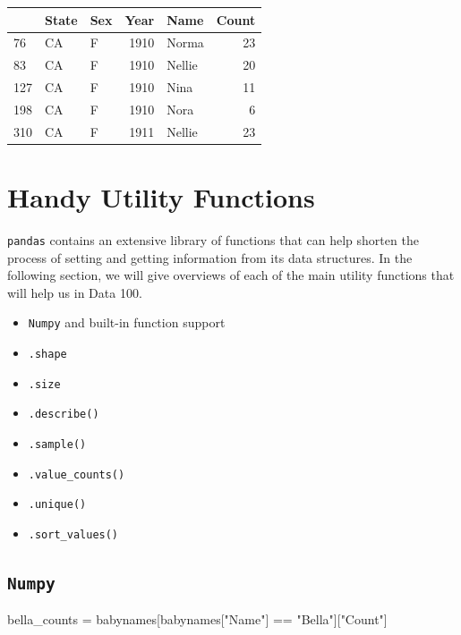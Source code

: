 \documentclass[
  letterpaper,
  DIV=11,
  numbers=noendperiod]{scrreprt}
\newenvironment{Shaded}{\begin{snugshade}}{\end{snugshade}}
\newcommand{\NormalTok}[1]{\textcolor[rgb]{0.00,0.23,0.31}{#1}}
\newcommand{\OperatorTok}[1]{\textcolor[rgb]{0.37,0.37,0.37}{#1}}
\newcommand{\StringTok}[1]{\textcolor[rgb]{0.13,0.47,0.30}{#1}}
\providecommand{\tightlist}{%
  \setlength{\itemsep}{0pt}\setlength{\parskip}{0pt}}\usepackage{longtable,booktabs,array}
\begin{document}
\begin{tabular}{lllrlr}
\toprule
{} & State & Sex &  Year &    Name &  Count \\
\midrule
76  &    CA &   F &  1910 &   Norma &     23 \\
83  &    CA &   F &  1910 &  Nellie &     20 \\
127 &    CA &   F &  1910 &    Nina &     11 \\
198 &    CA &   F &  1910 &    Nora &      6 \\
310 &    CA &   F &  1911 &  Nellie &     23 \\
\bottomrule
\end{tabular}

\hypertarget{handy-utility-functions}{%
\section{Handy Utility Functions}\label{handy-utility-functions}}

\texttt{pandas} contains an extensive library of functions that can help
shorten the process of setting and getting information from its data
structures. In the following section, we will give overviews of each of
the main utility functions that will help us in Data 100.

\begin{itemize}
\tightlist
\item
  \texttt{Numpy} and built-in function support
\item
  \texttt{.shape}
\item
  \texttt{.size}
\item
  \texttt{.describe()}
\item
  \texttt{.sample()}
\item
  \texttt{.value\_counts()}
\item
  \texttt{.unique()}
\item
  \texttt{.sort\_values()}
\end{itemize}

\hypertarget{numpy}{%
\subsection{\texorpdfstring{\texttt{Numpy}}{Numpy}}\label{numpy}}

\begin{Shaded}
\begin{Highlighting}[]
\NormalTok{bella\_counts }\OperatorTok{=}\NormalTok{ babynames[babynames[}\StringTok{"Name"}\NormalTok{] }\OperatorTok{==} \StringTok{"Bella"}\NormalTok{][}\StringTok{"Count"}\NormalTok{]}
\end{Highlighting}
\end{Shaded}
\end{document}

